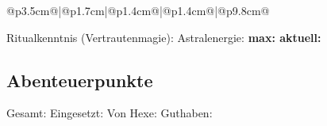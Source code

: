\documentclass{dsa}
\begin{document}
\begin{dsaCharacterSheet}
      \begin{dsaSheetBox}[18.2cm]
         \begin{tabu}{@{}p{3.5cm}@{}|@{}p{1.7cm}|@{}p{1.4cm}@{}|@{}p{1.4cm}@{}|@{}p{9.8cm}@{}}
             \Xhline{2\arrayrulewidth}
             \hline
             \hline
             \hline
             \hline 
             \hline
             \hline
             \hline
             \hline
             \hline
         \end{tabu}
         Ritualkenntnis (Vertrautenmagie): \setlength{\fboxrule}{0.6pt}  \hspace{0.7cm} Astralenergie: \normalfont \bfseries \scriptsize max:  aktuell: 
      \end{dsaSheetBox}
      
      \subsection*{Abenteuerpunkte}
      \vspace{-8pt}
      
      \begin{dsaSheetBox}[18.2cm]
         Gesamt:  Eingesetzt:  Von Hexe:  Guthaben: 
      \end{dsaSheetBox}
      
   \end{dsaCharacterSheet}
\end{document}
